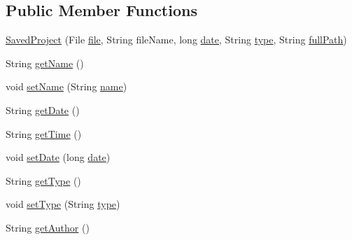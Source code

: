 \subsection*{Public Member Functions}
\begin{DoxyCompactItemize}
\item 
\hyperlink{classorg_1_1buildmlearn_1_1toolkit_1_1model_1_1SavedProject_adb8e49d8331062fbca7e82d88c636d5f}{Saved\+Project} (File \hyperlink{classorg_1_1buildmlearn_1_1toolkit_1_1model_1_1SavedProject_aecf6d31347ba21b07d34025fb55259c1}{file}, String file\+Name, long \hyperlink{classorg_1_1buildmlearn_1_1toolkit_1_1model_1_1SavedProject_a81205e5f76f19c9a197aa5b536b88a10}{date}, String \hyperlink{classorg_1_1buildmlearn_1_1toolkit_1_1model_1_1SavedProject_a8c4244d47e13f8ed782485b6ae80a8b8}{type}, String \hyperlink{classorg_1_1buildmlearn_1_1toolkit_1_1model_1_1SavedProject_a4693289823d599da19ede1518790df96}{full\+Path})
\item 
String \hyperlink{classorg_1_1buildmlearn_1_1toolkit_1_1model_1_1SavedProject_a80e2d2daf80abb1f4e896c681ecb93bc}{get\+Name} ()
\item 
void \hyperlink{classorg_1_1buildmlearn_1_1toolkit_1_1model_1_1SavedProject_a2e1f111a512798fb8b1acf992fcd5240}{set\+Name} (String \hyperlink{classorg_1_1buildmlearn_1_1toolkit_1_1model_1_1SavedProject_ac94adccdf486dfd98ff2e7e922467a10}{name})
\item 
String \hyperlink{classorg_1_1buildmlearn_1_1toolkit_1_1model_1_1SavedProject_a1e9523ff7c4ef3db7829059215ff70de}{get\+Date} ()
\item 
String \hyperlink{classorg_1_1buildmlearn_1_1toolkit_1_1model_1_1SavedProject_a6f3e7e12af92388d45db4613a4318d08}{get\+Time} ()
\item 
void \hyperlink{classorg_1_1buildmlearn_1_1toolkit_1_1model_1_1SavedProject_a3b47ee46e4cbea68adee68b64c2ec079}{set\+Date} (long \hyperlink{classorg_1_1buildmlearn_1_1toolkit_1_1model_1_1SavedProject_a81205e5f76f19c9a197aa5b536b88a10}{date})
\item 
String \hyperlink{classorg_1_1buildmlearn_1_1toolkit_1_1model_1_1SavedProject_a5f64a7ad50e81ee2757e986da3c4e0a8}{get\+Type} ()
\item 
void \hyperlink{classorg_1_1buildmlearn_1_1toolkit_1_1model_1_1SavedProject_a752a07c55de9337e3220a1ffdb4faf50}{set\+Type} (String \hyperlink{classorg_1_1buildmlearn_1_1toolkit_1_1model_1_1SavedProject_a8c4244d47e13f8ed782485b6ae80a8b8}{type})
\item 
String \hyperlink{classorg_1_1buildmlearn_1_1toolkit_1_1model_1_1SavedProject_ae2d5fe5caab78e44afee598b57e758fd}{get\+Author} ()

\end{DoxyCompactItemize}
